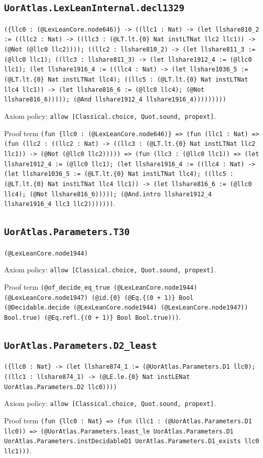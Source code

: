 \documentclass[11pt]{article}
\begin{document}
\subsection*{\texttt{UorAtlas.LexLeanInternal.decl1329}}
\noindent\texttt{(\{llc0 : (@LexLeanCore.node646)\} -> ((llc1 : Nat) -> (let llshare810\_2 := ((llc2 : Nat) -> ((llc3 : (@LT.lt.\{0\} Nat instLTNat llc2 llc1)) -> (@Not (@llc0 llc2)))); ((llc2 : llshare810\_2) -> (let llshare811\_3 := (@llc0 llc1); ((llc3 : llshare811\_3) -> (let llshare1912\_4 := (@llc0 llc1); (let llshare1916\_4 := ((llc4 : Nat) -> (let llshare1036\_5 := (@LT.lt.\{0\} Nat instLTNat llc4); ((llc5 : (@LT.lt.\{0\} Nat instLTNat llc4 llc1)) -> (let llshare816\_6 := (@llc0 llc4); (@Not llshare816\_6))))); (@And llshare1912\_4 llshare1916\_4)))))))))}\par
\noindent Axiom policy: \texttt{allow [Classical.choice, Quot.sound, propext]}.\par
\noindent Proof term \texttt{(fun \{llc0 : (@LexLeanCore.node646)\} => (fun (llc1 : Nat) => (fun (llc2 : ((llc2 : Nat) -> ((llc3 : (@LT.lt.\{0\} Nat instLTNat llc2 llc1)) -> (@Not (@llc0 llc2))))) => (fun (llc3 : (@llc0 llc1)) => (let llshare1912\_4 := (@llc0 llc1); (let llshare1916\_4 := ((llc4 : Nat) -> (let llshare1036\_5 := (@LT.lt.\{0\} Nat instLTNat llc4); ((llc5 : (@LT.lt.\{0\} Nat instLTNat llc4 llc1)) -> (let llshare816\_6 := (@llc0 llc4); (@Not llshare816\_6))))); (@And.intro llshare1912\_4 llshare1916\_4 llc3 llc2)))))))}.\par
\subsection*{\texttt{UorAtlas.Parameters.T30}}
\noindent\texttt{(@LexLeanCore.node1944)}\par
\noindent Axiom policy: \texttt{allow [Classical.choice, Quot.sound, propext]}.\par
\noindent Proof term \texttt{(@of\_decide\_eq\_true (@LexLeanCore.node1944) (@LexLeanCore.node1947) (@id.\{0\} (@Eq.\{(0 + 1)\} Bool (@Decidable.decide (@LexLeanCore.node1944) (@LexLeanCore.node1947)) Bool.true) (@Eq.refl.\{(0 + 1)\} Bool Bool.true)))}.\par
\subsection*{\texttt{UorAtlas.Parameters.D2\_least}}
\noindent\texttt{(\{llc0 : Nat\} -> (let llshare874\_1 := (@UorAtlas.Parameters.D1 llc0); ((llc1 : llshare874\_1) -> (@LE.le.\{0\} Nat instLENat UorAtlas.Parameters.D2 llc0))))}\par
\noindent Axiom policy: \texttt{allow [Classical.choice, Quot.sound, propext]}.\par
\noindent Proof term \texttt{(fun \{llc0 : Nat\} => (fun (llc1 : (@UorAtlas.Parameters.D1 llc0)) => (@UorAtlas.Parameters.least\_le UorAtlas.Parameters.D1 UorAtlas.Parameters.instDecidableD1 UorAtlas.Parameters.D1\_exists llc0 llc1)))}.\par
\end{document}
